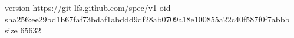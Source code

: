 version https://git-lfs.github.com/spec/v1
oid sha256:ee29bd1b67faf73bdaf1abddd9df28ab0709a18e100855a22c40f587f0f7abbb
size 65632
